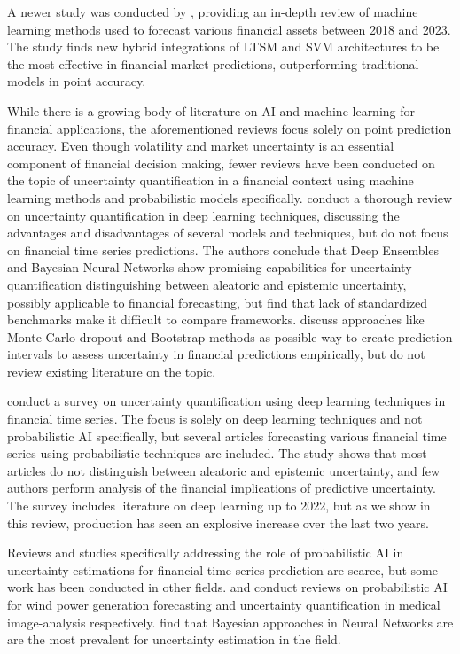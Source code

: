 A newer study was conducted by \textcite{Khattak2023SurveyAIModels}, providing an in-depth review of machine learning methods used to forecast various financial assets between 2018 and 2023. The study finds new hybrid integrations of LTSM and SVM architectures to be the most effective in financial market predictions, outperforming traditional models in point accuracy.

While there is a growing body of literature on AI and machine learning for financial applications, the aforementioned reviews focus solely on point prediction accuracy. Even though volatility and market uncertainty is an essential component of financial decision making, fewer reviews have been conducted on the topic of uncertainty quantification in a financial context using machine learning methods and probabilistic models specifically. \textcite{abdar2021ReviewUQ} conduct a thorough review on uncertainty quantification in deep learning techniques, discussing the advantages and disadvantages of several models and techniques, but do not focus on financial time series predictions. The authors conclude that Deep Ensembles and Bayesian Neural Networks show promising capabilities for uncertainty quantification distinguishing between aleatoric and epistemic uncertainty, possibly applicable to financial forecasting, but find that lack of standardized benchmarks make it difficult to compare frameworks. \textcite{Calvo-Pardo2020NeuralFinance} discuss approaches like Monte-Carlo dropout and Bootstrap methods as possible way to create prediction intervals to assess uncertainty in financial predictions empirically, but do not review existing literature on the topic. 

\textcite{Blasco_et_al_2024} conduct a survey on uncertainty quantification using deep learning techniques in financial time series. The focus is solely on deep learning techniques and not probabilistic AI specifically, but several articles forecasting various financial time series using probabilistic techniques are included. The study shows that most articles do not distinguish between aleatoric and epistemic uncertainty, and few authors perform analysis of the financial implications of predictive uncertainty. The survey includes literature on deep learning up to 2022, but as we show in this review, production has seen an explosive increase over the last two years.

Reviews and studies specifically addressing the role of probabilistic AI in uncertainty estimations for financial time series prediction are scarce, but some work has been conducted in other fields. \textcite{Zhang2014WindForecasting} and \textcite{Huang2024UQMedical} conduct reviews on probabilistic AI for wind power generation forecasting and uncertainty quantification in medical image-analysis respectively. \textcite{Huang2024UQMedical} find that Bayesian approaches in Neural Networks are are the most prevalent for uncertainty estimation in the field. 

